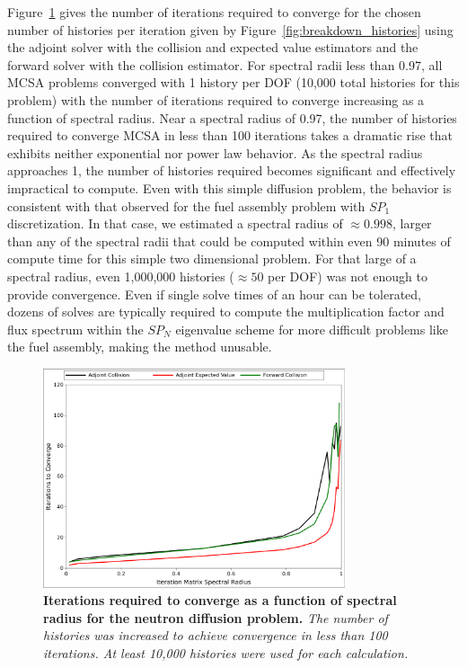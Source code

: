 \documentclass[letterpaper,12pt]{article}
\begin{document}
Figure~\ref{fig:breakdown_iterations} gives the number of iterations
required to converge for the chosen number of histories per iteration
given by Figure~\ref{fig:breakdown_histories} using the adjoint solver
with the collision and expected value estimators and the forward
solver with the collision estimator. For spectral radii less than
0.97, all MCSA problems converged with 1 history per DOF (10,000 total
histories for this problem) with the number of iterations required to
converge increasing as a function of spectral radius. Near a spectral
radius of 0.97, the number of histories required to converge MCSA in
less than 100 iterations takes a dramatic rise that exhibits neither
exponential nor power law behavior. As the spectral radius approaches
1, the number of histories required becomes significant and
effectively impractical to compute. Even with this simple diffusion
problem, the behavior is consistent with that observed for the fuel
assembly problem with $SP_1$ discretization. In that case, we
estimated a spectral radius of $\approx 0.998$, larger than any of the
spectral radii that could be computed within even 90 minutes of
compute time for this simple two dimensional problem. For that large
of a spectral radius, even 1,000,000 histories ($\approx 50$ per DOF)
was not enough to provide convergence. Even if single solve times of
an hour can be tolerated, dozens of solves are typically required to
compute the multiplication factor and flux spectrum within the $SP_N$
eigenvalue scheme for more difficult problems like the fuel assembly,
making the method unusable.
\begin{figure}[t!]
  \begin{center}
    \includegraphics[width=3.5in]{breakdown_iterations.pdf}
  \end{center}
  \caption{\textbf{Iterations required to converge as a function of
      spectral radius for the neutron diffusion problem.} \textit{The
      number of histories was increased to achieve convergence in less
      than 100 iterations. At least 10,000 histories were used for
      each calculation.}}
  \label{fig:breakdown_iterations}
\end{figure}
\end{document}
